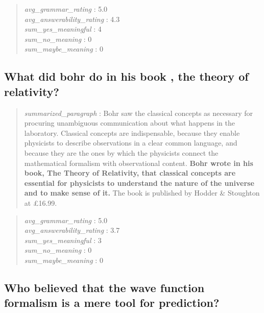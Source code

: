 \begin{quote}
\emph{avg\_grammar\_rating} : 5.0\\
\emph{avg\_answerability\_rating} : 4.3\\
\emph{sum\_yes\_meaningful} : 4\\
\emph{sum\_no\_meaning} : 0\\
\emph{sum\_maybe\_meaning} : 0
\end{quote}

\hypertarget{what-did-bohr-do-in-his-book-the-theory-of-relativity}{%
\subsection{What did bohr do in his book , the theory of
relativity?}\label{what-did-bohr-do-in-his-book-the-theory-of-relativity}}

\begin{quote}
\emph{summarized\_paragraph} : Bohr saw the classical concepts as
necessary for procuring unambiguous communication about what happens in
the laboratory. Classical concepts are indispensable, because they
enable physicists to describe observations in a clear common language,
and because they are the ones by which the physicists connect the
mathematical formalism with observational content. \textbf{Bohr wrote in
his book, The Theory of Relativity, that classical concepts are
essential for physicists to understand the nature of the universe and to
make sense of it.} The book is published by Hodder \& Stoughton at
£16.99.
\end{quote}

\begin{quote}
\emph{avg\_grammar\_rating} : 5.0\\
\emph{avg\_answerability\_rating} : 3.7\\
\emph{sum\_yes\_meaningful} : 3\\
\emph{sum\_no\_meaning} : 0\\
\emph{sum\_maybe\_meaning} : 0
\end{quote}

\hypertarget{who-believed-that-the-wave-function-formalism-is-a-mere-tool-for-prediction}{%
\subsection{Who believed that the wave function formalism is a mere tool
for
prediction?}\label{who-believed-that-the-wave-function-formalism-is-a-mere-tool-for-prediction}}

